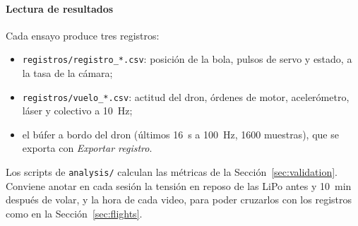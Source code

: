 \paragraph{Lectura de resultados}
Cada ensayo produce tres registros:
\begin{itemize}
  \item \texttt{registros/registro\_*.csv}: posición de la bola, pulsos de servo y estado, a la tasa de la cámara;
  \item \texttt{registros/vuelo\_*.csv}: actitud del dron, órdenes de motor, acelerómetro, láser y colectivo a \SI{10}{\hertz};
  \item el búfer a bordo del dron (últimos \SI{16}{\second} a \SI{100}{\hertz}, 1600 muestras), que se exporta con \emph{Exportar registro}.
\end{itemize}
Los scripts de \texttt{analysis/} calculan las métricas de la Sección~\ref{sec:validation}. Conviene anotar en cada sesión la tensión en reposo de las LiPo antes y \SI{10}{\minute} después de volar, y la hora de cada video, para poder cruzarlos con los registros como en la Sección~\ref{sec:flights}.

